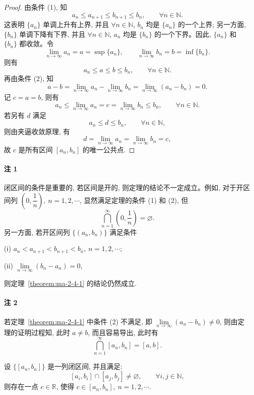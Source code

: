 \begin{proof}
由条件 (1), 知
\[
  a_n\leqslant a_{n+1}\leqslant b_{n+1}\leqslant b_n,\qquad \forall n\in\mathbb{N}.
\]
这表明 $\{a_n\}$ 单调上升有上界, 并且 $\forall n\in\mathbb{N}$, $b_n$ 均是 $\{a_n\}$ 的一个上界; 另一方面, $\{b_n\}$ 单调下降有下界, 并且 $\forall n\in\mathbb{N}$, $a_n$ 均是 $\{b_n\}$ 的一个下界。因此, $\{a_n\}$ 和 $\{b_n\}$ 都收敛。令
\[
  \lim_{n\to\infty}a_n=a=\sup\{a_n\},\qquad
  \lim_{n\to\infty}b_n=b=\inf\{b_n\}.
\]
则有
\[
  a_n\leqslant a\leqslant b\leqslant b_n,\qquad \forall n\in\mathbb{N}.
\]
再由条件 (2), 知
\[
  a-b=\lim_{n\to\infty}a_n-\lim_{n\to\infty}b_n
  =
  \lim_{n\to\infty}(a_n-b_n)=0.
\]
记 $c=a=b$, 则有
\[
  a_n\leqslant\lim_{n\to\infty}a_n=c=\lim_{n\to\infty}b_n\leqslant b_n,\qquad \forall n\in\mathbb{N}.
\]
若另有 $d$ 满足
\[
  a_n\leqslant d\leqslant b_n,\qquad \forall n\in\mathbb{N},
\]
则由夹逼收敛原理, 有
\[
  d=\lim_{n\to\infty}a_n=\lim_{n\to\infty}b_n=c,
\]
故 $c$ 是所有区间 $[a_n,b_n]$ 的唯一公共点.
\end{proof}


\paragraph*{注 1}
闭区间的条件是重要的, 若区间是开的, 则定理的结论不一定成立。例如, 对于开区间列 $\left(0,\dfrac1n\right),\ n=1,2,\cdots$, 显然满足定理的条件 (1) 和 (2), 但
\[
  \bigcap_{n=1}^\infty\left(0,\frac1n\right)=\varnothing.
\]
另一方面, 若开区间列 $\{(a_n,b_n)\}$ 满足条件

(i) $a_n<a_{n+1}<b_{n+1}<b_n,\ n=1,2,\cdots$;

(ii) $\lim\limits_{n\to\infty}(b_n-a_n)=0$,

则定理~\ref{theorem:ma-2-4-1} 的结论仍然成立.

\paragraph*{注 2}
若定理~\ref{theorem:ma-2-4-1} 中条件 (2) 不满足, 即 $\lim\limits_{n\to\infty}(a_n-b_n)\ne0$, 则由定理的证明过程知, 此时 $a\ne b$, 而且容易导出, 此时有
\[
  \bigcap_{n=1}^\infty [a_n,b_n]=[a,b].
\]

\begin{example}\label{example:ma-2-4-1}
设 $\{[a_n,b_n]\}$ 是一列闭区间, 并且满足:
\[
  [a_i,b_i]\cap[a_j,b_j]\ne\varnothing,\qquad \forall i,j\in\mathbb{N},
\]
则存在一点 $c\in\mathbb{R}$, 使得 $c\in[a_n,b_n],\ n=1,2,\cdots$.
\end{example}


